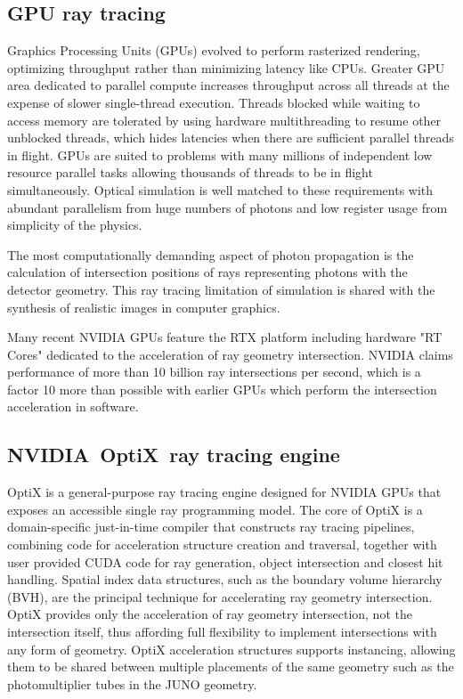 \documentclass{webofc}
\newcommand{\comment}[1]{}
\begin{document}
\subsection{GPU ray tracing}%
%
Graphics Processing Units (GPUs) evolved to perform rasterized rendering, optimizing throughput\cite{throughput} rather than minimizing latency like CPUs.
Greater GPU area dedicated to parallel compute increases throughput across all threads at the expense 
of slower single-thread execution. 
Threads blocked while waiting to access memory are tolerated by using hardware multithreading to 
resume other unblocked threads, which hides latencies when there are sufficient parallel threads in flight. 
GPUs are suited to problems with many millions of independent low resource parallel tasks allowing thousands of threads 
to be in flight simultaneously.
%
Optical simulation is well matched to these requirements with abundant parallelism 
from huge numbers of photons and low register usage from simplicity of the physics.

The most computationally demanding aspect of photon propagation
is the calculation of intersection positions of rays representing photons with the detector geometry.
This ray tracing limitation of simulation is shared with the synthesis of realistic images in computer graphics. 
\comment{Due to the many applications
of ray tracing in the advertising, design, games and film industries, the computer graphics
community has continuously improved ray tracing techniques.}
%
Many recent NVIDIA GPUs feature the RTX platform including hardware "RT Cores" 
dedicated to the acceleration of ray geometry intersection.
NVIDIA claims performance of more than 10 billion ray intersections 
per second, which is a factor 10 more than possible with earlier GPUs
which perform the intersection acceleration in software. 
%
%
\subsection{NVIDIA\textregistered\ OptiX\texttrademark\ ray tracing engine}
%
OptiX is a general-purpose ray tracing engine
designed for NVIDIA GPUs that exposes an accessible single ray programming model.
The core of OptiX is a domain-specific just-in-time compiler that constructs 
ray tracing pipelines, combining code for acceleration structure creation and traversal, 
together with user provided CUDA code for ray generation, object intersection and closest hit handling.
Spatial index data structures, such as the boundary volume hierarchy (BVH), are the 
principal technique for accelerating ray geometry intersection.  
OptiX provides only the acceleration of ray geometry intersection, not the intersection itself,
thus affording full flexibility to implement intersections with any form of geometry. 
OptiX acceleration structures supports instancing, allowing them to be shared 
between multiple placements of the same geometry such as the photomultiplier tubes in the JUNO geometry.  
\end{document}
